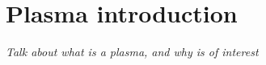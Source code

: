 \chapter{Plasma introduction}
\label{ch:plasma-intro}


\textit{Talk about what is a plasma, and why is of interest}
